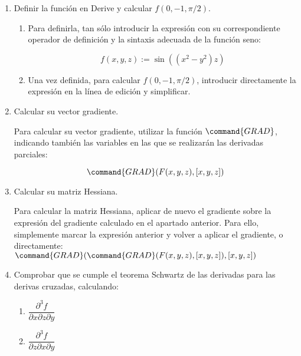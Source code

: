 \begin{enumerate}[leftmargin=*]
\begin{enumerate}
\item Definir la función en Derive y calcular $f(0,-1,\pi/2)$.


\begin{indicacion}
{
\begin{enumerate}

\item Para definirla, tan sólo introducir la expresión con su
correspondiente operador de definición y la sintaxis adecuada de la
función seno:

\[
f(x,y,z):=\sin((x^2-y^2)z)
\]

\item Una vez definida, para calcular $f(0,-1,\pi/2)$, introducir
directamente la expresión en la línea de edición y simplificar.

\end{enumerate}
}
\end{indicacion}

\item Calcular su vector gradiente.

\begin{indicacion}
{Para calcular su vector gradiente, utilizar la función
$\command{GRAD}$, indicando también las variables en las que se
realizarán las derivadas parciales:

\[
\command{GRAD}(F(x,y,z), [x,y,z])
\]

}
\end{indicacion}

\item Calcular su matriz Hessiana.

\begin{indicacion}
{Para calcular la matriz Hessiana, aplicar de nuevo el gradiente
sobre la expresión del gradiente calculado en el apartado anterior.
Para ello, simplemente marcar la expresión anterior y volver a
aplicar el gradiente, o directamente:
$\command{GRAD}(\command{GRAD}(F(x,y,z),[x,y,z]),[x,y,z])$

}
\end{indicacion}

\item Comprobar que se cumple el teorema Schwartz de las derivadas
para las derivas cruzadas, calculando:

\begin{enumerate}

\item $\dfrac{{\partial ^3 f}} {{\partial x\partial z\partial y}}$

\item $\dfrac{{\partial ^3 f}} {{\partial z\partial x\partial y}}$


\end{enumerate}
\end{enumerate}
\end{enumerate}
